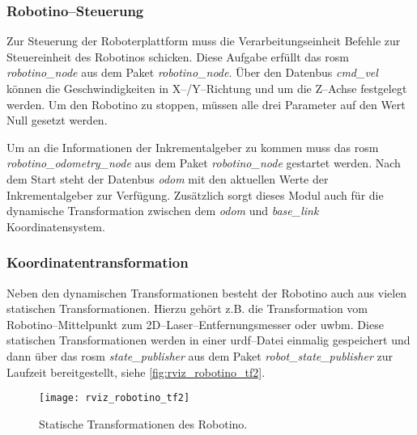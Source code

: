 \subsubsection{Robotino--Steuerung}

Zur Steuerung der Roboterplattform muss die Verarbeitungseinheit Befehle zur Steuereinheit des Robotinos schicken. Diese Aufgabe erfüllt das \Gls{rosm} \textit{robotino\_node} aus dem Paket \textit{robotino\_node}. Über den Datenbus \textit{cmd\_vel} können die Geschwindigkeiten in X--/Y--Richtung und um die Z--Achse festgelegt werden. Um den Robotino zu stoppen, müssen alle drei Parameter auf den Wert Null gesetzt werden.

Um an die Informationen der Inkrementalgeber zu kommen muss das \Gls{rosm} \textit{robotino\_odometry\_node} aus dem Paket \textit{robotino\_node} gestartet werden. Nach dem Start steht der Datenbus \textit{odom} mit den aktuellen Werte der Inkrementalgeber zur Verfügung. Zusätzlich sorgt dieses Modul auch für die dynamische Transformation zwischen dem \textit{odom} und \textit{base\_link} Koordinatensystem.


\begin{comment}
--------------------------------------------------------------------------------
- \url{http://wiki.ros.org/robot_state_publisher}
- \url{http://wiki.ros.org/urdf}
\end{comment}
\subsubsection{Koordinatentransformation}

Neben den dynamischen Transformationen besteht der Robotino auch aus vielen statischen Transformationen. Hierzu gehört z.B. die Transformation vom Robotino--Mittelpunkt zum 2D--Laser--Entfernungsmesser oder \Gls{uwbm}. Diese statischen Transformationen werden in einer \Gls{urdf}--Datei einmalig gespeichert und dann über das \Gls{rosm} \textit{state\_publisher} aus dem Paket \textit{robot\_state\_publisher} zur Laufzeit bereitgestellt, siehe \autoref{fig:rviz_robotino_tf2}.

\begin{figure}[h]
	\centering
	\texttt{[image: rviz\_robotino\_tf2]}
	\caption{Statische Transformationen des Robotino.}
	\label{fig:rviz_robotino_tf2}
\end{figure}


\begin{comment}
--------------------------------------------------------------------------------
- \url{http://wiki.ros.org/joy}
- todo: Referenz auf das lst:joy_node stehen lassen?
\end{comment}
